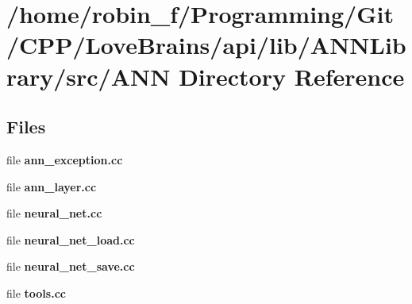 \section{/home/robin\+\_\+f/\+Programming/\+Git/\+C\+P\+P/\+Love\+Brains/api/lib/\+A\+N\+N\+Library/src/\+A\+N\+N Directory Reference}
\label{dir_4a871fa53ba1695fc8c471f501534dc6}
\subsection*{Files}
\begin{DoxyCompactItemize}
\item 
file {\bfseries ann\+\_\+exception.\+cc}
\item 
file {\bfseries ann\+\_\+layer.\+cc}
\item 
file {\bfseries neural\+\_\+net.\+cc}
\item 
file {\bfseries neural\+\_\+net\+\_\+load.\+cc}
\item 
file {\bfseries neural\+\_\+net\+\_\+save.\+cc}
\item 
file {\bfseries tools.\+cc}
\end{DoxyCompactItemize}
